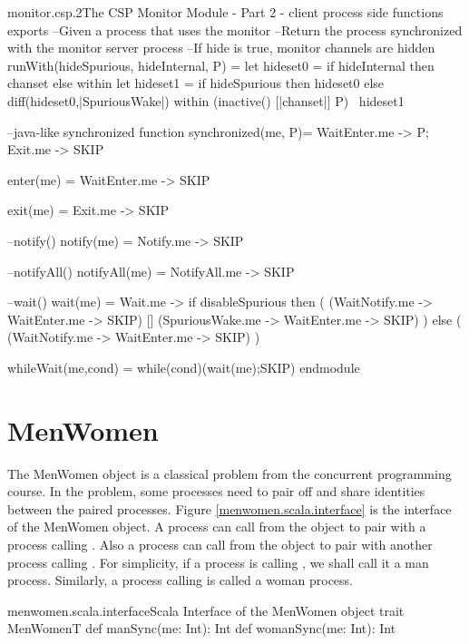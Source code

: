 \documentclass{article}
\begin{document}
\begin{cspfloat}{monitor.csp.2}{The CSP Monitor Module - Part 2 - client process side functions}
exports
  --Given a process that uses the monitor
  --Return the process synchronized with the monitor server process
  --If hide is true, monitor channels are hidden
  runWith(hideSpurious, hideInternal, P) = 
    let hideset0 = if hideInternal then chanset else {} within
    let hideset1 = if hideSpurious then hideset0 
                   else diff(hideset0,{|SpuriousWake|}) within
    (inactive({}) [|chanset|] P) \ hideset1
  
  --java-like synchronized function
  synchronized(me, P)= WaitEnter.me -> P; Exit.me -> SKIP

  enter(me) = WaitEnter.me -> SKIP

  exit(me) = Exit.me -> SKIP

  --notify()
  notify(me) = Notify.me -> SKIP

  --notifyAll()
  notifyAll(me) = NotifyAll.me -> SKIP

  --wait()
  wait(me) =
    Wait.me -> 
    if disableSpurious then (
      (WaitNotify.me -> WaitEnter.me -> SKIP)
   [] (SpuriousWake.me -> WaitEnter.me -> SKIP)
  ) else (
      (WaitNotify.me -> WaitEnter.me -> SKIP)
  )
  
  whileWait(me,cond) = while(cond)(wait(me);SKIP)
endmodule
\end{cspfloat}

\newpage
\section{MenWomen}
The MenWomen object is a classical problem from the concurrent programming course. In the problem, some processes need to pair off and share identities between the paired processes. Figure \ref{menwomen.scala.interface} is the interface of the MenWomen object. A process can call  from the object to pair with a process calling . Also a process can call  from the object to pair with another process calling . For simplicity, if a process is calling , we shall call it a man process. Similarly, a process calling  is called a woman process.

\begin{scalainline}{menwomen.scala.interface}{Scala Interface of the MenWomen object}
trait MenWomenT{
  def manSync(me: Int): Int
  def womanSync(me: Int): Int
}
\end{scalainline}
\end{document}
